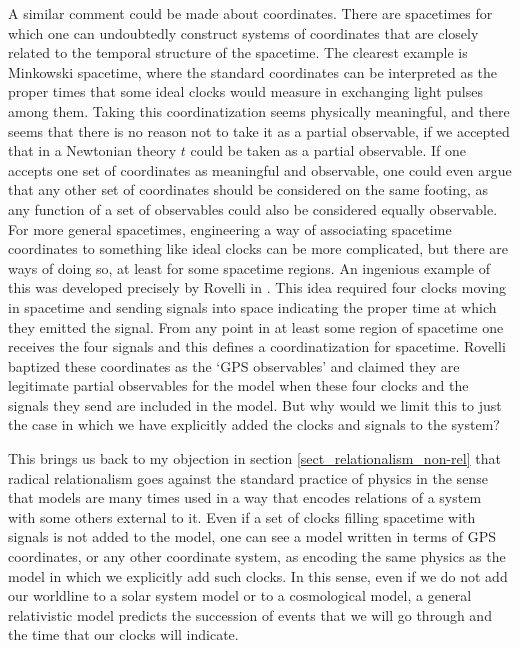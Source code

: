 \documentclass[12 pt]{article}
\begin{document}
A similar comment could be made about coordinates. There are spacetimes for which one can undoubtedly construct systems of coordinates that are closely related to the temporal structure of the spacetime. The clearest example is Minkowski spacetime, where the standard coordinates can be interpreted as the proper times that some ideal clocks would measure in exchanging light pulses among them. Taking this coordinatization seems physically meaningful, and there seems that there is no reason not to take it as a partial observable, if we accepted that in a Newtonian theory $t$ could be taken as a partial observable. If one accepts one set of coordinates as meaningful and observable, one could even argue that any other set of coordinates should be considered on the same footing, as any function of a set of observables could also be considered equally observable. For more general spacetimes, engineering a way of associating spacetime coordinates to something like ideal clocks can be more complicated, but there are ways of doing so, at least for some spacetime regions. An ingenious example of this was developed precisely by Rovelli in \citep{Rovelli2002a}. This idea required four clocks moving in spacetime and sending signals into space indicating the proper time at which they emitted the signal. From any point in at least some region of spacetime one receives the four signals and this defines a coordinatization for spacetime. Rovelli baptized these coordinates as the `GPS observables' and claimed they are legitimate partial observables for the model when these four clocks and the signals they send are included in the model. But why would we limit this to just the case in which we have explicitly added the clocks and signals to the system?

This brings us back to my objection in section \ref{sect_relationalism_non-rel} that radical relationalism goes against the standard practice of physics in the sense that models are many times used in a way that encodes relations of a system with some others external to it. Even if a set of clocks filling spacetime with signals is not added to the model, one can see a model written in terms of GPS coordinates, or any other coordinate system, as encoding the same physics as the model in which we explicitly add such clocks. In this sense, even if we do not add our worldline to a solar system model or to a cosmological model, a general relativistic model predicts the succession of events that we will go through and the time that our clocks will indicate. 
\end{document}
